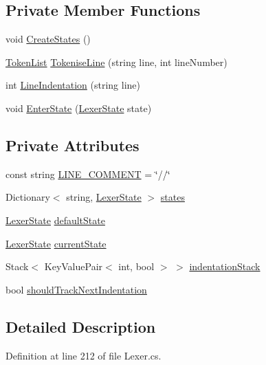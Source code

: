 \subsection*{Private Member Functions}
\begin{DoxyCompactItemize}
\item 
void \hyperlink{a00129_a646081a52b241abaafe5e0cfaeafd751}{Create\-States} ()
\item 
\hyperlink{a00177}{Token\-List} \hyperlink{a00129_a20b63f6ef434f6a40fd388f262f03fa8}{Tokenise\-Line} (string line, int line\-Number)
\item 
int \hyperlink{a00129_a4079b10b099e5d85f5482f9e7eac4179}{Line\-Indentation} (string line)
\item 
void \hyperlink{a00129_ad3ef08f822b310d9864774b057b96995}{Enter\-State} (\hyperlink{a00130}{Lexer\-State} state)
\end{DoxyCompactItemize}
\subsection*{Private Attributes}
\begin{DoxyCompactItemize}
\item 
const string \hyperlink{a00129_a29c457125cc4876f8571f5d9afa372e2}{L\-I\-N\-E\-\_\-\-C\-O\-M\-M\-E\-N\-T} = \char`\"{}//\char`\"{}
\item 
Dictionary$<$ string, \hyperlink{a00130}{Lexer\-State} $>$ \hyperlink{a00129_a2c65c0ba90f973e459583badefef216a}{states}
\item 
\hyperlink{a00130}{Lexer\-State} \hyperlink{a00129_a16b5dbf27a377cde5e8ba0eaa05b5710}{default\-State}
\item 
\hyperlink{a00130}{Lexer\-State} \hyperlink{a00129_ac90b7dce8103425a148f9e8588f14137}{current\-State}
\item 
Stack$<$ Key\-Value\-Pair$<$ int, bool $>$ $>$ \hyperlink{a00129_a6631a1b1a9109258ab18927e7587ff9b}{indentation\-Stack}
\item 
bool \hyperlink{a00129_ac670aac2245cbd4694dfbd5b69313218}{should\-Track\-Next\-Indentation}
\end{DoxyCompactItemize}


\subsection{Detailed Description}


Definition at line 212 of file Lexer.\-cs.



